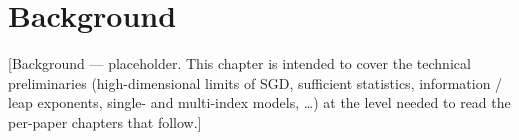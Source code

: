\chapter{Background}
\label{chap:background}

[Background --- placeholder. This chapter is intended to cover the
technical preliminaries (high-dimensional limits of SGD, sufficient
statistics, information / leap exponents, single- and multi-index models,
\dots) at the level needed to read the per-paper chapters that follow.]
